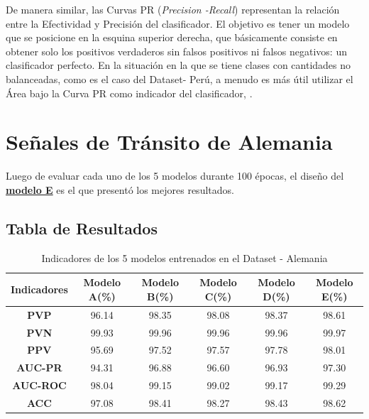 	De manera similar, las Curvas PR (\textit{Precision -Recall}) representan la relación entre la Efectividad y Precisión del clasificador. El objetivo es tener un modelo que se posicione en la esquina superior derecha, que básicamente consiste en obtener solo los positivos verdaderos sin falsos positivos ni falsos negativos: un clasificador perfecto. En la situación en la que se tiene clases con cantidades no balanceadas, como es el caso del Dataset- Perú, a menudo es más útil utilizar el Área bajo la Curva PR como indicador del clasificador, \citep{Davis-2006-RPR-1143844-1143874}.


		
	\section{Señales de Tránsito de Alemania}
		Luego de evaluar cada uno de los 5 modelos durante 100 épocas, el diseño del \underline{\bf modelo E} es el que presentó los mejores resultados.

		\subsection{Tabla de Resultados}


		\begin{table}[H]
			\begin{center}
			\caption{\small{Indicadores de los 5 modelos entrenados en el Dataset - Alemania}}
			\vspace{1.1em}
			\begin{tabular}{|c|c|c|c|c|c|}
			\cline{1-6}
			\textbf{Indicadores}    & \textbf{Modelo A(\%)} & \textbf{Modelo B(\%)} & \textbf{Modelo C(\%)} &\textbf{ Modelo D(\%)} & \textbf{Modelo E(\%)} \\ \hline
			\multicolumn{1}{|c|}{\textbf{PVP}}        & 96.14     & 98.35       & 98.08       & 98.37       & 98.61       \\ \hline
			\multicolumn{1}{|c|}{\textbf{PVN}}        & 99.93     & 99.96       & 99.96       & 99.96       & 99.97       \\ \hline
			\multicolumn{1}{|c|}{\textbf{PPV}}        & 95.69     & 97.52       & 97.57       & 97.78       & 98.01      \\ \hline
			\multicolumn{1}{|c|}{\textbf{AUC-PR}}     & 94.31     & 96.88       & 96.60       & 96.93       & 97.30       \\ \hline
			\multicolumn{1}{|c|}{\textbf{AUC-ROC}}    & 98.04     & 99.15       & 99.02       & 99.17       & 99.29       \\ \hline
			\multicolumn{1}{|c|}{\textbf{ACC}}        & 97.08     & 98.41       & 98.27       & 98.43       & 98.62       \\ \hline
			\end{tabular}
			\end{center}
		\end{table}

